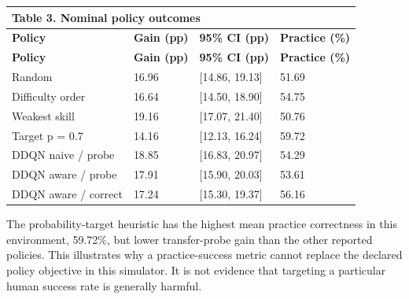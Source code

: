 \documentclass[preprint,11pt,authoryear]{elsarticle}
\begin{document}
\begin{longtable}{p{}p{}p{}p{}}

\multicolumn{4}{l}{\textbf{Table 3.} Nominal policy outcomes}\\

\toprule

\textbf{Policy} & \textbf{Gain (pp)} & \textbf{95\% CI (pp)} & \textbf{Practice (\%)}\\\midrule\endfirsthead

\textbf{Policy} & \textbf{Gain (pp)} & \textbf{95\% CI (pp)} & \textbf{Practice (\%)}\\\midrule\endhead

\bottomrule\endfoot

Random & 16.96 & [14.86, 19.13] & 51.69\\

Difficulty order & 16.64 & [14.50, 18.90] & 54.75\\

Weakest skill & 19.16 & [17.07, 21.40] & 50.76\\

Target p = 0.7 & 14.16 & [12.13, 16.24] & 59.72\\

DDQN naive / probe & 18.85 & [16.83, 20.97] & 54.29\\

DDQN aware / probe & 17.91 & [15.90, 20.03] & 53.61\\

DDQN aware / correct & 17.24 & [15.30, 19.37] & 56.16\\

\end{longtable}\endgroup

The probability-target heuristic has the highest mean practice correctness in this environment, 59.72\%, but lower transfer-probe gain than the other reported policies. This illustrates why a practice-success metric cannot replace the declared policy objective in this simulator. It is not evidence that targeting a particular human success rate is generally harmful.
\end{document}
